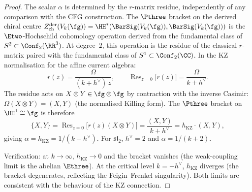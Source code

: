 \begin{proof}
The scalar $\alpha$ is determined by the $r$-matrix
residue, independently of any comparison with the CFG
construction. The $\Pthree$ bracket on the derived
chiral centre $Z^{\mathrm{der}}_{\mathrm{ch}}(V_k(\fg))
= \HH^*(\BarSig(V_k(\fg)), \BarSig(V_k(\fg)))$ is the
$\Etwo$-Hochschild cohomology operation derived from
the fundamental class of $S^2 \subset \Conf_2(\RR^3)$.
At degree~$2$, this operation is the residue of the
classical $r$-matrix paired with the fundamental class
of $S^1 \subset \Conf_2(\CC)$. In the KZ normalisation
for the affine current algebra:
\begin{equation}\label{eq:p3-from-r-matrix-residue}
 r(z) = \frac{\Omega}{(k + h^\vee)\,z},
 \qquad
 \operatorname{Res}_{z=0}\bigl[r(z)\bigr]
 = \frac{\Omega}{k + h^\vee}.
\end{equation}
The residue acts on $X \otimes Y \in \fg \otimes \fg$
by contraction with the inverse Casimir:
$\Omega(X \otimes Y) = (X, Y)$ (the normalised Killing
form). The $\Pthree$ bracket on $\HH^1 \cong \fg$ is
therefore
\begin{equation}\label{eq:p3-bracket-normalisation}
 \{X, Y\}
 = \operatorname{Res}_{z=0}
 \bigl[r(z)(X \otimes Y)\bigr]
 = \frac{(X, Y)}{k + h^\vee}
 = h_{\mathrm{KZ}} \cdot (X, Y),
\end{equation}
giving $\alpha = h_{\mathrm{KZ}} = 1/(k + h^\vee)$.
For $\mathfrak{sl}_2$, $h^\vee = 2$ and
$\alpha = 1/(k + 2)$.

Verification: at $k \to \infty$,
$h_{\mathrm{KZ}} \to 0$ and the bracket vanishes (the
weak-coupling limit is the abelian $\Ethree$). At the
critical level $k = -h^\vee$, $h_{\mathrm{KZ}}$ diverges
(the bracket degenerates, reflecting the Feigin--Frenkel
singularity). Both limits are consistent with
the behaviour of the KZ connection.


\end{proof}
